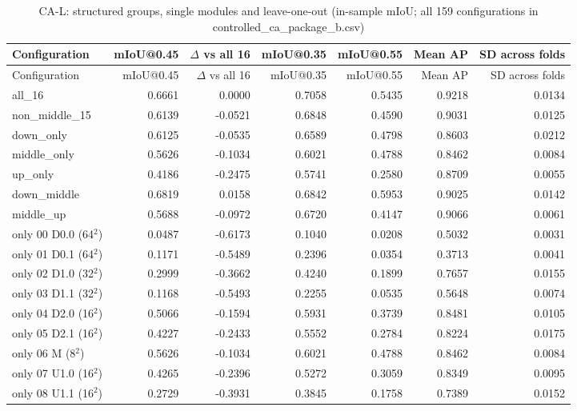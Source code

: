 {\scriptsize\setlength{\tabcolsep}{3pt}
\begin{longtable}{>{\raggedright\arraybackslash}p{3.73cm}rrrrrr}
\caption{CA-L: structured groups, single modules and leave-one-out (in-sample mIoU; all 159 configurations in controlled\_\allowbreak{}ca\_\allowbreak{}package\_\allowbreak{}b.csv)}\label{tab:a1_ca_l}\\
\toprule
Configuration & mIoU@0.45 & $\Delta$ vs all 16 & mIoU@0.35 & mIoU@0.55 & Mean AP & SD across folds \\
\midrule
\endfirsthead
\toprule
Configuration & mIoU@0.45 & $\Delta$ vs all 16 & mIoU@0.35 & mIoU@0.55 & Mean AP & SD across folds \\
\midrule
\endhead
all\_\allowbreak{}16 & 0.6661 & 0.0000 & 0.7058 & 0.5435 & 0.9218 & 0.0134 \\
non\_\allowbreak{}middle\_\allowbreak{}15 & 0.6139 & -0.0521 & 0.6848 & 0.4590 & 0.9031 & 0.0125 \\
down\_\allowbreak{}only & 0.6125 & -0.0535 & 0.6589 & 0.4798 & 0.8603 & 0.0212 \\
middle\_\allowbreak{}only & 0.5626 & -0.1034 & 0.6021 & 0.4788 & 0.8462 & 0.0084 \\
up\_\allowbreak{}only & 0.4186 & -0.2475 & 0.5741 & 0.2580 & 0.8709 & 0.0055 \\
down\_\allowbreak{}middle & 0.6819 & 0.0158 & 0.6842 & 0.5953 & 0.9025 & 0.0142 \\
middle\_\allowbreak{}up & 0.5688 & -0.0972 & 0.6720 & 0.4147 & 0.9066 & 0.0061 \\
only 00 D0.0 (64$^2$) & 0.0487 & -0.6173 & 0.1040 & 0.0208 & 0.5032 & 0.0031 \\
only 01 D0.1 (64$^2$) & 0.1171 & -0.5489 & 0.2396 & 0.0354 & 0.3713 & 0.0041 \\
only 02 D1.0 (32$^2$) & 0.2999 & -0.3662 & 0.4240 & 0.1899 & 0.7657 & 0.0155 \\
only 03 D1.1 (32$^2$) & 0.1168 & -0.5493 & 0.2255 & 0.0535 & 0.5648 & 0.0074 \\
only 04 D2.0 (16$^2$) & 0.5066 & -0.1594 & 0.5931 & 0.3739 & 0.8481 & 0.0105 \\
only 05 D2.1 (16$^2$) & 0.4227 & -0.2433 & 0.5552 & 0.2784 & 0.8224 & 0.0175 \\
only 06 M (8$^2$) & 0.5626 & -0.1034 & 0.6021 & 0.4788 & 0.8462 & 0.0084 \\
only 07 U1.0 (16$^2$) & 0.4265 & -0.2396 & 0.5272 & 0.3059 & 0.8349 & 0.0095 \\
only 08 U1.1 (16$^2$) & 0.2729 & -0.3931 & 0.3845 & 0.1758 & 0.7389 & 0.0152 \\

\end{longtable}}
